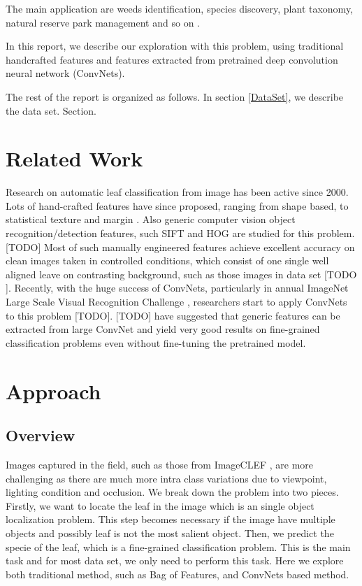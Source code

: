 \documentclass[journal]{IEEEtran}
\begin{document}
The main application are weeds identification, species discovery, plant taxonomy, natural reserve park management and so on \cite{Pedro13}.


In this report, we describe our exploration with this problem, using traditional handcrafted features and features extracted from pretrained deep convolution neural network (ConvNets).

The rest of the report is organized as follows. In section \ref{DataSet}, we describe the data set. Section.


\section{Related Work }
Research on automatic leaf classification from image has been active since 2000. Lots of hand-crafted features have since proposed, ranging from shape based, to statistical texture and margin \cite{Charles13} \cite{Pedro13} \cite{Cho2002}. Also generic computer vision object recognition/detection features, such SIFT and HOG are studied for this problem. [TODO]
Most of such manually engineered features achieve excellent accuracy on clean images taken in controlled conditions, which consist of one single well aligned leave on contrasting background, such as those images in data set [TODO ].
Recently, with the huge success of ConvNets, particularly in annual ImageNet Large Scale Visual Recognition Challenge \cite{Alex2014}, researchers start to apply ConvNets to this problem [TODO].  [TODO] have suggested that generic features can be extracted from large ConvNet and yield very good results on fine-grained classification problems even without fine-tuning the pretrained model.

\section{Approach}

\subsection{Overview}
Images captured in the field, such as those from ImageCLEF \cite{ImageCLEF2013}, are more challenging as there are much more intra class variations due to viewpoint, lighting condition and occlusion.
We break down the problem into two pieces. Firstly, we want to locate the leaf in the image which is an single object localization problem.  This step becomes necessary if the image have multiple objects and possibly leaf is not the most salient object.  Then, we predict the specie of the leaf, which is a fine-grained classification problem. This is the main task and for most data set, we only need to perform this task. Here we explore both traditional method, such as Bag of Features,  and ConvNets based method.
\end{document}
